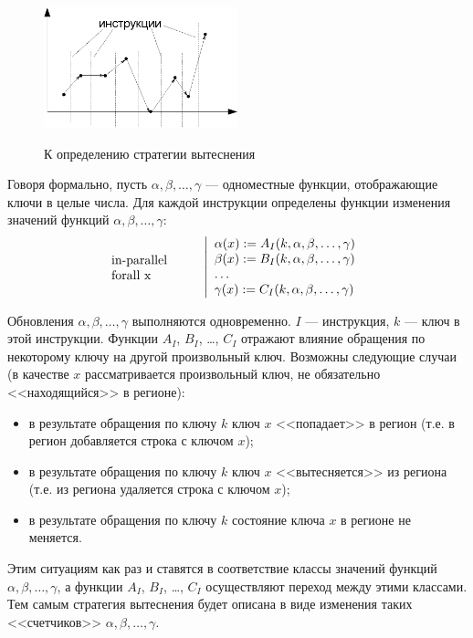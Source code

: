 \begin{figure}[h] \center
  \includegraphics[width=0.5\textwidth]{2.theor/graphic}\\
  \caption{К определению стратегии вытеснения}\label{fig:graphic}
\end{figure}

Говоря формально, пусть $\alpha, \beta, \dots, \gamma$ --- одноместные функции,
отображающие ключи в целые числа. Для каждой инструкции определены функции
изменения значений функций $\alpha, \beta, \dots, \gamma$:
$$\parbox{2.5cm}{in-parallel\\forall x~}\left|\begin{array}{l}
\alpha(x) := A_I(k, \alpha, \beta, \dots, \gamma)\\
\beta(x) := B_I(k, \alpha, \beta, \dots, \gamma)\\
\dots\\
\gamma(x) := C_I(k, \alpha, \beta, \dots, \gamma)\\
\end{array}\right.
$$

Обновления $\alpha, \beta, \dots, \gamma$ выполняются одновременно. $I$ ---
инструкция, $k$ --- ключ в этой инструкции. Функции $A_I$, $B_I$, \dots, $C_I$
отражают влияние обращения по некоторому ключу на другой произвольный ключ.
Возможны следующие случаи (в качестве $x$ рассматривается произвольный ключ, не
обязательно <<находящийся>> в регионе):
\begin{itemize}
    \item в результате обращения по ключу $k$ ключ $x$ <<попадает>> в регион
(т.е. в регион добавляется строка с ключом $x$);
    \item в результате обращения по ключу $k$ ключ $x$ <<вытесняется>> из
региона (т.е. из региона удаляется строка с ключом $x$);
    \item в результате обращения по ключу $k$ состояние ключа $x$ в регионе не
меняется.
\end{itemize}

Этим ситуациям как раз и ставятся в соответствие классы значений функций
$\alpha, \beta, \dots, \gamma$, а функции $A_I$, $B_I$, \dots, $C_I$
осуществляют переход между этими классами. Тем самым стратегия вытеснения будет
описана в виде изменения таких <<счетчиков>> $\alpha, \beta, \dots, \gamma$.

